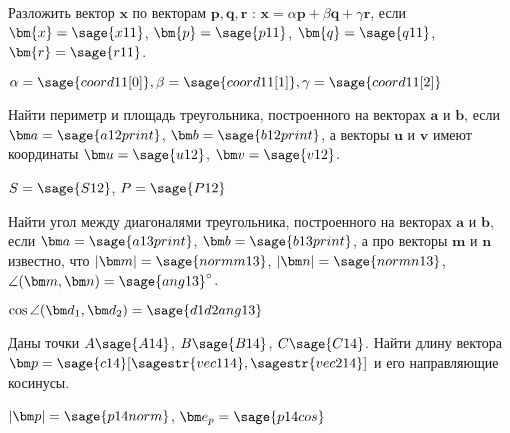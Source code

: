 \begin{question}
	Разложить вектор $\bm x$ по векторам $\bm p, \bm q, \bm r$ : $\bm x = \alpha\bm p + \beta\bm q + \gamma\bm r$, если
	$\bm{x}=\sage{x11}$, $\bm{p}=\sage{p11}$, $\bm{q}=\sage{q11}$, $\bm{r}=\sage{r11}$.
\end{question}
\begin{solution}
	\ensuremath{\alpha = \sage{coord11[0]}, \beta = \sage{coord11[1]}, \gamma = \sage{coord11[2]}}
\end{solution}
\begin{question}
Найти периметр и площадь треугольника, построенного на векторах $\bm a$ и $\bm b$, если $\bm a=\sage{a12print}$, $\bm b=\sage{b12print}$, а векторы $\bm u$ и $\bm v$ имеют координаты $\bm u=\sage{u12}$, $\bm v=\sage{v12}$.
\end{question}
\begin{solution}
$S=\sage{S12}$, $P=\sage{P12}$
\end{solution}

\begin{question}
Найти угол между диагоналями треугольника, построенного на векторах $\bm a$ и $\bm b$, если $\bm a=\sage{a13print}$, $\bm b=\sage{b13print}$, а про векторы $\bm m$ и $\bm n$ известно, что $|\bm m|=\sage{normm13}$, $|\bm n|=\sage{normn13}$, $\angle(\bm m, \bm n)=\sage{ang13}^\circ$.
\end{question}
\begin{solution}
$\cos\angle(\bm d_1, \bm d_2)=\sage{d1d2ang13}$
\end{solution}
\begin{question}
Даны точки $A\sage{A14}$, $B\sage{B14}$, $C\sage{C14}$. Найти длину вектора $\bm p=\sage{c14} [\sagestr{vec114}, \sagestr{vec214}]$ и его направляющие косинусы.
\end{question}
\begin{solution}
$|\bm p|=\sage{p14norm}$, $\bm e_p=\sage{p14cos}$
\end{solution}

